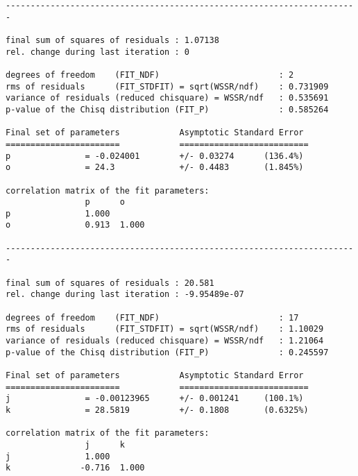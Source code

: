 \begin{verbatim}
-----------------------------------------------------------------------

final sum of squares of residuals : 1.07138
rel. change during last iteration : 0

degrees of freedom    (FIT_NDF)                        : 2
rms of residuals      (FIT_STDFIT) = sqrt(WSSR/ndf)    : 0.731909
variance of residuals (reduced chisquare) = WSSR/ndf   : 0.535691
p-value of the Chisq distribution (FIT_P)              : 0.585264

Final set of parameters            Asymptotic Standard Error
=======================            ==========================
p               = -0.024001        +/- 0.03274      (136.4%)
o               = 24.3             +/- 0.4483       (1.845%)

correlation matrix of the fit parameters:
                p      o      
p               1.000 
o               0.913  1.000 

-----------------------------------------------------------------------

final sum of squares of residuals : 20.581
rel. change during last iteration : -9.95489e-07

degrees of freedom    (FIT_NDF)                        : 17
rms of residuals      (FIT_STDFIT) = sqrt(WSSR/ndf)    : 1.10029
variance of residuals (reduced chisquare) = WSSR/ndf   : 1.21064
p-value of the Chisq distribution (FIT_P)              : 0.245597

Final set of parameters            Asymptotic Standard Error
=======================            ==========================
j               = -0.00123965      +/- 0.001241     (100.1%)
k               = 28.5819          +/- 0.1808       (0.6325%)

correlation matrix of the fit parameters:
                j      k      
j               1.000 
k              -0.716  1.000 
    \end{verbatim}

